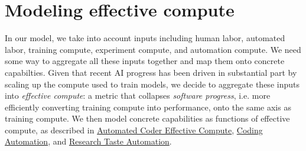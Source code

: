 \documentclass{article}
\theoremstyle{definition}
\begin{document}

\section{Modeling effective compute} \label{Effective compute}

In our model, we take into account inputs including human labor, automated labor, training compute, experiment compute, and automation compute. We need some way to aggregate all these inputs together and map them onto concrete capabilties. Given that recent AI progress has been driven in substantial part by scaling up the compute used to train models, we decide to aggregate these inputs into \textit{effective compute}: a metric that collapses \textit{software progress}, i.e. more efficiently converting training compute into performance, onto the same axis as training compute. We then model concrete capabilities as functions of effective compute, as described in \hyperref[Automated Coder effective compute]{Automated Coder Effective Compute}, \hyperref[Coding automation]{Coding Automation}, and \hyperref[Research taste automation]{Research Taste Automation}.
\end{document}
